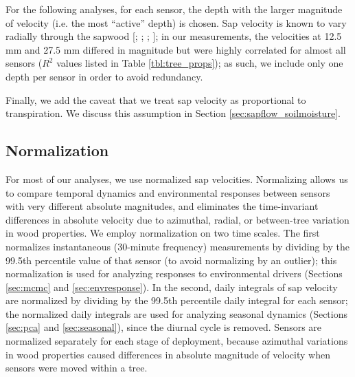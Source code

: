 For the following analyses, for each sensor, the depth with the larger magnitude of velocity (i.e. the most ``active'' depth) is chosen.  Sap velocity is known to vary radially through the sapwood [\cite{cohen1985determination}; \cite{vcermak1992radial}; \cite{nadezhdina2002radial}; \cite{ford2004assessing}]; in our measurements, the velocities at 12.5 mm and 27.5 mm differed in magnitude but were highly correlated for almost all sensors ($R^2$ values listed in Table \ref{tbl:tree_props}); as such, we include only one depth per sensor in order to avoid redundancy.

Finally, we add the caveat that we treat sap velocity as proportional to transpiration.  We discuss this assumption in Section \ref{sec:sapflow_soilmoisture}.

\subsection{Normalization}
\label{sec:normalization}
For most of our analyses, we use normalized sap velocities.  Normalizing allows us to compare temporal dynamics and environmental responses between sensors with very different absolute magnitudes, and eliminates the time-invariant differences in absolute velocity due to azimuthal, radial, or between-tree variation in wood properties.  We employ normalization on two time scales.   The first normalizes instantaneous (30-minute frequency) measurements by dividing by the 99.5th percentile value of that sensor (to avoid normalizing by an outlier); this normalization is used for analyzing responses to environmental drivers (Sections \ref{sec:mcmc} and \ref{sec:envresponse}).  In the second, daily integrals of sap velocity are normalized by dividing by the 99.5th percentile daily integral for each sensor; the normalized daily integrals are used for analyzing seasonal dynamics (Sections \ref{sec:pca} and \ref{sec:seasonal}), since the diurnal cycle is removed.  Sensors are normalized separately for each stage of deployment, because azimuthal variations in wood properties caused differences in absolute magnitude of velocity when sensors were moved within a tree.


